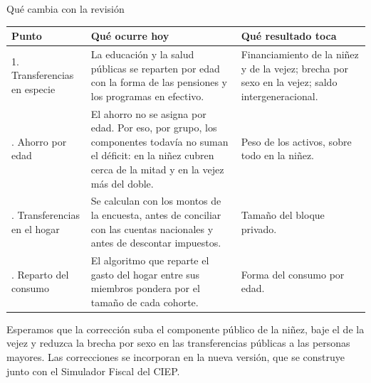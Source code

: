 \documentclass[aspectratio=169,10pt]{beamer}
\begin{document}
\begin{frame}{Qué cambia con la revisión}
  \vspace{0.1em}
  \begin{center}\scriptsize
  \begin{tabularx}{\textwidth}{@{}p{}X p{}@{}}
    \toprule
    Punto & Qué ocurre hoy & Qué resultado toca \\
    \midrule
    1. Transferencias en especie & La educación y la salud públicas se reparten por edad con la forma de las pensiones y los programas en efectivo. & Financiamiento de la niñez y de la vejez; brecha por sexo en la vejez; saldo intergeneracional. \\
    \addlinespace
    2. Ahorro por edad & El ahorro no se asigna por edad. Por eso, por grupo, los componentes todavía no suman el déficit: en la niñez cubren cerca de la mitad y en la vejez más del doble. & Peso de los activos, sobre todo en la niñez. \\
    \addlinespace
    3. Transferencias en el hogar & Se calculan con los montos de la encuesta, antes de conciliar con las cuentas nacionales y antes de descontar impuestos. & Tamaño del bloque privado. \\
    \addlinespace
    4. Reparto del consumo & El algoritmo que reparte el gasto del hogar entre sus miembros pondera por el tamaño de cada cohorte. & Forma del consumo por edad. \\
    \bottomrule
  \end{tabularx}
  \end{center}
  \vspace{0.2em}
  {\small Esperamos que la corrección suba el componente público de la niñez, baje el de la vejez y reduzca la brecha por sexo en las transferencias públicas a las personas mayores. Las correcciones se incorporan en la nueva versión, que se construye junto con el Simulador Fiscal del CIEP.\par}
\end{frame}

\end{document}
